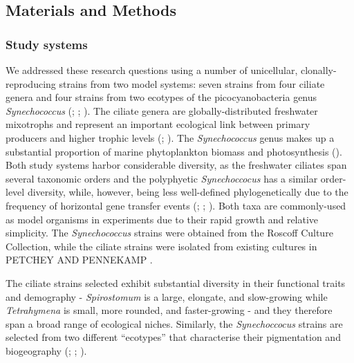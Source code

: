 \documentclass[
  letterpaper,
  DIV=11,
  numbers=noendperiod]{scrartcl}
\begin{document}
\subsection{Materials and Methods}\label{sec-DAE_methods}

\subsubsection{Study systems}\label{study-systems}

We addressed these research questions using a number of unicellular,
clonally-reproducing strains from two model systems: seven strains from
four ciliate genera and four strains from two ecotypes of the
picocyanobacteria genus \emph{Synechococcus}
(;
;
). The ciliate genera are
globally-distributed freshwater mixotrophs and represent an important
ecological link between primary producers and higher trophic levels
(;
). The
\emph{Synechococcus} genus makes up a substantial proportion of marine
phytoplankton biomass and photosynthesis
(). Both study systems
harbor considerable diversity, as the freshwater ciliates span several
taxonomic orders and the polyphyetic \emph{Synechoccocus} has a similar
order-level diversity, while, however, being less well-defined
phylogenetically due to the frequency of horizontal gene transfer events
(;
;
). Both taxa are
commonly-used as model organisms in experiments due to their rapid
growth and relative simplicity. The \emph{Synechococcus} strains were
obtained from the Roscoff Culture Collection, while the ciliate strains
were isolated from existing cultures in PETCHEY AND PENNEKAMP .

The ciliate strains selected exhibit substantial diversity in their
functional traits and demography - \emph{Spirostomum} is a large,
elongate, and slow-growing while \emph{Tetrahymena} is small, more
rounded, and faster-growing - and they therefore span a broad range of
ecological niches. Similarly, the \emph{Synechoccocus} strains are
selected from two different ``ecotypes'' that characterise their
pigmentation and biogeography (; ;
).
\end{document}
